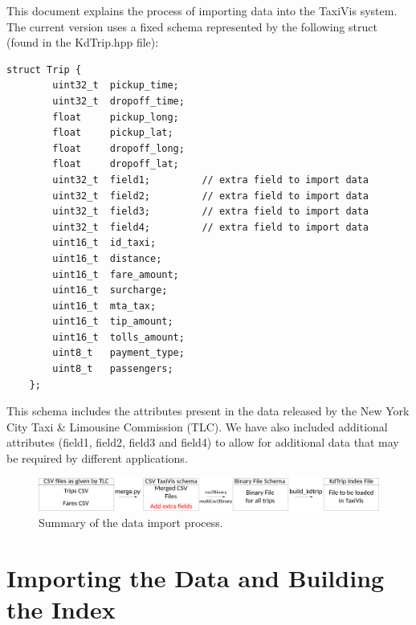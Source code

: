 \documentclass[12pt]{article}
\begin{document}
\lstset{language=C}

\noindent This document explains the process of importing data into the TaxiVis system.
The current version uses a fixed schema represented by the following struct (found in the KdTrip.hpp file):

\begin{lstlisting}
struct Trip {
        uint32_t  pickup_time;
        uint32_t  dropoff_time;
        float     pickup_long;
        float     pickup_lat;
        float     dropoff_long;
        float     dropoff_lat;
        uint32_t  field1;         // extra field to import data
        uint32_t  field2;         // extra field to import data
        uint32_t  field3;         // extra field to import data
        uint32_t  field4;         // extra field to import data
        uint16_t  id_taxi;
        uint16_t  distance;     
        uint16_t  fare_amount;  
        uint16_t  surcharge;    
        uint16_t  mta_tax;      
        uint16_t  tip_amount;   
        uint16_t  tolls_amount; 
        uint8_t   payment_type;
        uint8_t   passengers;       
    };
\end{lstlisting}

\medskip

\noindent This schema includes the attributes present in the data
released by the New York City Taxi \& Limousine Commission (TLC). We have
also included additional attributes (field1, field2, field3 and
field4) to allow for additional data that may be required by different
applications.

\begin{figure}[h]
\includegraphics[width=\linewidth]{figs/process.png}
\caption{Summary of the data import process.}
\label{fig:process}
\end{figure}

\section{Importing the Data and Building the Index}
\end{document}
